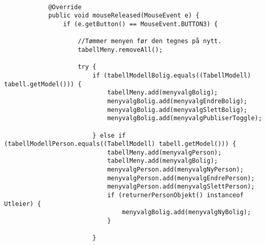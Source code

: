 \begin{lstlisting}[caption=Eksempel på hvilke menyvalg som dukker opp ved høyreklikk i tabellen.,label=kode:eks1]

            @Override
            public void mouseReleased(MouseEvent e) {
                if (e.getButton() == MouseEvent.BUTTON3) {

                    //Tømmer menyen før den tegnes på nytt.
                    tabellMeny.removeAll();

                    try {
                        if (tabellModellBolig.equals((TabellModell) tabell.getModel())) {
                            tabellMeny.add(menyvalgBolig);
                            menyvalgBolig.add(menyvalgEndreBolig);
                            menyvalgBolig.add(menyvalgSlettBolig);
                            menyvalgBolig.add(menyvalgPubliserToggle);

                        } else if (tabellModellPerson.equals((TabellModell) tabell.getModel())) {
                            tabellMeny.add(menyvalgPerson);
                            tabellMeny.add(menyvalgBolig);
                            menyvalgPerson.add(menyvalgNyPerson);
                            menyvalgPerson.add(menyvalgEndrePerson);
                            menyvalgPerson.add(menyvalgSlettPerson);
                            if (returnerPersonObjekt() instanceof Utleier) {
                                menyvalgBolig.add(menyvalgNyBolig);
                            }

                        }
\end{lstlisting} 


